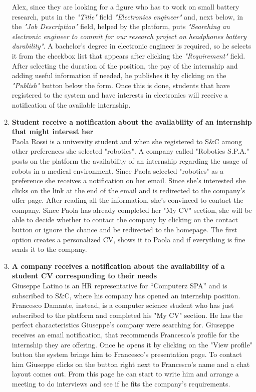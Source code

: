 \begin{enumerate}
    Alex, since they are looking for a figure who has to work on small battery research, puts in the \textit{"Title"} field \textit{"Electronics engineer"} and, next below, in the \textit{"Job Description"} field, helped by the platform, puts \textit{"Searching an electronic engineer to commit for our research project on headphones battery durability"}.
    A bachelor's degree in electronic engineer is required, so he selects it from the checkbox list that appears after clicking the \textit{"Requirement"} field.
    After selecting the duration of the position, the pay of the internship and adding useful information if needed, he publishes it by clicking on the \textit{"Publish"} button below the form. Once this is done, students that have registered to the system and have interests in electronics will receive a notification of the available internship.
    
    
      \item \textbf{Student receive a notification about the availability of an internship that might interest her}\\
       Paola Rossi is a university student and when she registered to S\&C among other preferences she selected "robotics". A company called "Robotics S.P.A." posts on the platform the availability of an internship regarding the usage of robots in a medical environment. Since Paola selected "robotics" as a preference she receives a notification on her email. Since she's interested she clicks on the link at the end of the email and is redirected to the company's offer page. After reading all the information, she's convinced to contact the company.
       Since Paola has already completed her "My CV" section, she will be able to decide whether to contact the company by clicking on the contact button or ignore the chance and be redirected to the homepage. The first option creates a personalized CV, shows it to Paola and if everything is fine sends it to the company. 
      
      
      \item \textbf{A company receives a notification about the availability of a student CV corresponding to their needs}\\
      Giuseppe Latino is an HR representative for “Computerz SPA” and is subscribed to S\&C, where his company has opened an internship position. Francesco Damante, instead, is a computer science student who has just subscribed to the platform and completed his "My CV" section. He has the perfect characteristics Giuseppe’s company were searching for. Giuseppe receives an email notification, that recommends Francesco's profile for the internship they are offering. Once he opens it by clicking on the "View profile" button the system brings him to Francesco’s presentation page. To contact him Giuseppe clicks on the button right next to Francesco’s name and a chat layout comes out. From this page he can start to write him and arrange a meeting to do interviews and see if he fits the company’s requirements.
      

\end{enumerate}
